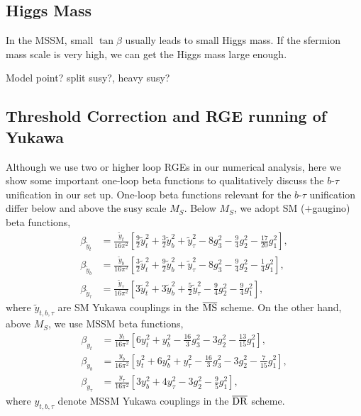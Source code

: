 \documentclass[12pt]{article}
\newcommand{\1}{\mbox{1}\hspace{-0.25em}\mbox{l}}
\begin{document}
\subsection{Higgs Mass}
In the MSSM, small $\tan\beta$ usually leads to small Higgs mass.
If the sfermion mass scale is very high, we can get the Higgs mass large enough.


Model point? split susy?, heavy susy?


\subsection{Threshold Correction and RGE running of Yukawa}

Although we use two or higher loop RGEs in our numerical analysis, here
we show some important one-loop beta functions to qualitatively discuss
the $b$-$\tau$ unification in our set up.  One-loop beta functions relevant
for the $b$-$\tau$ unification differ below and above the susy scale
$M_S$.  Below $M_S$, we adopt SM ($+$gaugino) beta functions,
\begin{align}
 \beta_{\tilde{y}_t} &= \frac{\tilde{y}_t}{16\pi^2} \left[ \frac{9}{2}
 \tilde{y}_t^2 + \frac{3}{2} \tilde{y}_b^2 + \tilde{y}_\tau^2 - 8g_3^2 -
 \frac{9}{4} g_2^2 - \frac{17}{20} g_1^2 \right],\\
 \beta_{\tilde{y}_b} &= \frac{\tilde{y}_b}{16\pi^2} \left[ \frac{3}{2}
 \tilde{y}_t^2 + \frac{9}{2} \tilde{y}_b^2 + \tilde{y}_\tau^2 - 8g_3^2
 - \frac{9}{4} g_2^2 - \frac{1}{4} g_1^2 \right],\\
 \beta_{\tilde{y}_\tau} &= \frac{\tilde{y}_\tau}{16\pi^2} \left[
 3\tilde{y}_t^2 + 3\tilde{y}_b^2 + \frac{5}{2} \tilde{y}_\tau^2 -
 \frac{9}{4} g_2^2 - \frac{9}{4} g_1^2 \right],
\end{align}
where $\tilde{y}_{t,b,\tau}$ are SM Yukawa couplings in the
$\overline{\rm MS}$ scheme.  On the other hand, above $M_S$, we use MSSM
beta functions,
\begin{align}
 \beta_{y_t} &= \frac{y_t}{16\pi^2} \left[ 6y_t^2 + y_b^2 - \frac{16}{3}
 g_3^2 - 3g_2^2 - \frac{13}{15} g_1^2 \right],\label{eq_beta_yt}\\
 \beta_{y_b} &= \frac{y_b}{16\pi^2} \left[ y_t^2 + 6y_b^2 + y_\tau^2 -
 \frac{16}{3} g_3^2 - 3g_2^2 - \frac{7}{15} g_1^2 \right],\label{eq_beta_yb} \\
 \beta_{y_\tau} &= \frac{y_\tau}{16\pi^2} \left[ 3y_b^2 + 4y_\tau^2 -
 3g_2^2 - \frac{9}{5} g_1^2 \right],\label{eq_beta_ytau}
\end{align}
where $y_{t,b,\tau}$ denote MSSM Yukawa couplings in the
$\overline{\rm DR}$ scheme.
\end{document}
